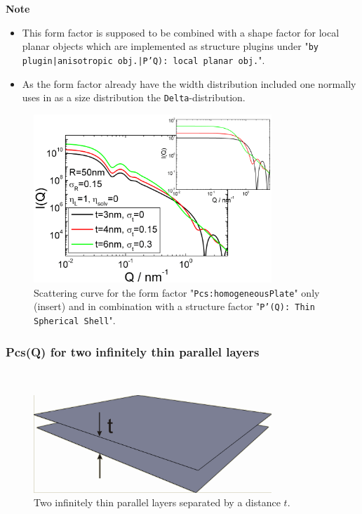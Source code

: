 \noindent
\textbf{Note}
\begin{itemize}
  \item This form factor is supposed to be combined with a shape factor for
local planar objects which are implemented as structure  plugins
under "\texttt{by plugin|anisotropic obj.|P'Q): local planar
obj.}".
\item As the form factor already have the width distribution included one normally uses in \SASfit as a size distribution
the \texttt{Delta}-distribution.
\end{itemize}

\begin{figure}[htb]
\begin{center}
\includegraphics[width=0.8\textwidth,height=0.55\textwidth]{../images/form_factor/anisotropic/localplanarIQ.png}
\end{center}
\caption{Scattering curve for the form factor "\texttt{Pcs:homogeneousPlate}" only (insert) and
in combination with a structure factor "\texttt{P'(Q): Thin Spherical Shell}".}
\label{fig_IQ:homogeneousXS}
\end{figure}

\clearpage
\subsubsection{Pcs(Q) for two infinitely thin parallel layers} ~\\
\label{plugin:Pcs:TwoInfinitelyThinLayers}

\begin{figure}[htb]
\begin{center}
\includegraphics[width=0.8\textwidth,height=0.328\textwidth]{../images/form_factor/anisotropic/planar2thin_txt.png}
\end{center}
\caption{Two infinitely thin parallel layers separated by a distance $t$.}
\label{fig:Pcs:TwoInfinitelyThinLayers}
\end{figure}


